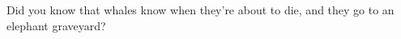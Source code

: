 \item Did you know that whales know when they're about to die, and
  they go to an elephant graveyard?